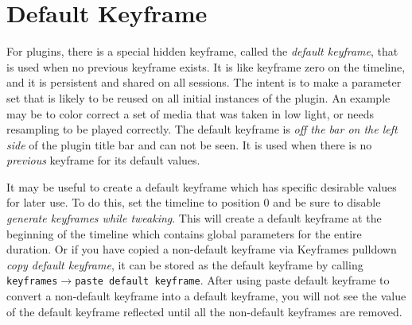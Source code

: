 \section{Default Keyframe}%
\label{sec:default_keyframe}

For plugins, there is a special hidden keyframe, called the \textit{default keyframe}, that is used when no previous keyframe exists.  It is like keyframe zero on the timeline, and it is persistent and shared on
all sessions.  The intent is to make a parameter set that is likely to be reused on all initial instances of the plugin.  An example may be to color correct a set of media that was taken in low light, or needs resampling to be played correctly.  The default keyframe is \textit{off the bar on the left side} of the plugin title bar and can not be seen.  It is used when there is no \textit{previous} keyframe for its default values.

It may be useful to create a default keyframe which has specific desirable values for later use.  To do this, set the timeline to position 0 and be sure to disable \textit{generate keyframes while tweaking}.  This will create a default keyframe at the beginning of the timeline which contains global parameters for the entire duration.  Or if you have copied a non-default keyframe via Keyframes pulldown \textit{copy default keyframe}, it can be stored as the default keyframe by calling \texttt{keyframes$\rightarrow$paste default keyframe}.  After using paste default keyframe to convert a non-default keyframe into a default keyframe, you will not see the value of the default keyframe reflected until all the non-default keyframes are removed.

